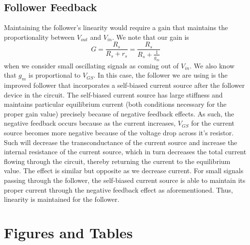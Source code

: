 \documentclass{article}
\begin{document}
\subsection{Follower Feedback}
    Maintaining the follower's linearity would require a gain that maintains the proportionality between $V_{out}$ and $V_{in}$. We note that our gain is
    \begin{equation}
        G = \frac{R_s}{R_s + r_s} = \frac{R_s}{R_s + \frac{1}{g_m}}
    \end{equation}
     when we consider small oscillating signals as coming out of $V_{in}$. We also know that $g_m$ is proportional to $V_{GS}$. In this case, the follower we are using is the improved follower that incorporates a self-biased current source after the follower device in the circuit. The self-biased current source has large stiffness and maintains particular equilibrium current (both conditions necessary for the proper gain value) precisely because of negative feedback effects. As such, the negative feedback occurs because as the current increases, $V_{GS}$ for the current source becomes more negative because of the voltage drop across it's resistor. Such will decrease the transconductance of the current source and increase the internal resistance of the current source, which in turn decreases the total current flowing through the circuit, thereby returning the current to the equilibrium value. The effect is similar but opposite as we decrease current. For small signals passing through the follower, the self-biased current source is able to maintain its proper current through the negative feedback effect as aforementioned. Thus, linearity is maintained for the follower.




\section{Figures and Tables}
\end{document}
